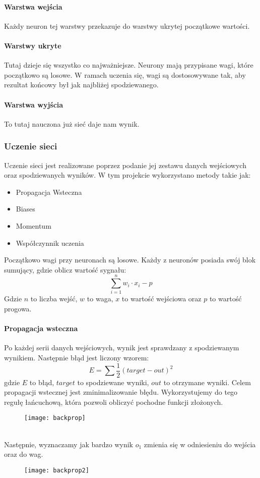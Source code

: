 \documentclass[12pt,a4paper]{article}
\begin{document}
\paragraph*{Warstwa wejścia} Każdy neuron tej warstwy przekazuje do warstwy ukrytej początkowe wartości.
\paragraph*{Warstwy ukryte} Tutaj dzieje się wszystko co najważniejsze. Neurony mają przypisane wagi, które początkowo są losowe. W ramach uczenia się, wagi są dostosowywane tak, aby rezultat końcowy był jak najbliżej spodziewanego.
\paragraph*{Warstwa wyjścia} To tutaj nauczona już sieć daje nam wynik.
\subsubsection*{Uczenie sieci}
Uczenie sieci jest realizowane poprzez podanie jej zestawu danych wejściowych oraz spodziewanych wyników. W tym projekcie wykorzystano metody takie jak:
\begin{itemize}
\item Propagacja Wsteczna
\item Biases
\item Momentum
\item Współczynnik uczenia
\end{itemize}
Początkowo wagi przy neuronach są losowe. Każdy z neuronów posiada swój blok sumujący, gdzie oblicz wartość sygnału:
$$ \sum_{i=1}^{n}{w_i\cdot x_i - p} $$
Gdzie $n$ to liczba wejść, $w$ to waga, $x$ to wartość wejściowa oraz $p$ to wartość progowa.
\paragraph*{Propagacja wsteczna} 
Po każdej serii danych wejściowych, wynik jest sprawdzany z spodziewanym wynikiem. Następnie błąd jest liczony wzorem:
$$ E = \sum{\frac{1}{2}(target - out)^2} $$
gdzie $E$ to błąd, $target$ to spodziewane wyniki, $out$ to otrzymane wyniki.
Celem propagacji wstecznej jest zminimalizowanie błędu. Wykorzystujemy do tego regułę łańcuchową, która pozwoli obliczyć pochodne funkcji złożonych.
\begin{figure}[hp]
\centering
\texttt{[image: backprop]}
\end{figure}\\
Następnie, wyznaczamy jak bardzo wynik $o_1$ zmienia się w odniesieniu do wejścia oraz do wag.
\begin{figure}[hp]
\centering
\texttt{[image: backprop2]}
\end{figure}\\
\end{document}
